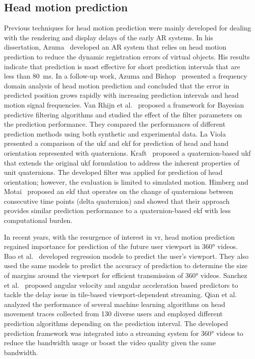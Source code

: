 \documentclass[sigconf]{acmart}			%
\begin{document}
\subsection{Head motion prediction}
\label{sec:prediction_bg}
Previous techniques for head motion prediction were mainly developed for dealing with the rendering and display delays of the early AR systems.
In his dissertation, Azuma~\cite{azuma1995} developed an AR system that relies on head motion prediction to reduce the dynamic registration errors of virtual objects. His results indicate that prediction is most effective for short prediction intervals that are less than \SI{80}{ms}.
In a follow-up work, Azuma and Bishop~\cite{azuma1995_freq} presented a frequency domain analysis of head motion prediction and concluded that the error in predicted position grows rapidly with increasing prediction intervals and head motion signal frequencies.
Van Rhijn et al.~\cite{van_rhijn2005} proposed a framework for Bayesian predictive filtering algorithms and studied the effect of the filter parameters on the prediction performance. 
They compared the performances of different prediction methods using both synthetic and experimental data.
La Viola~\cite{laviola2003} presented a comparison of the \gls{ukf} and \gls{ekf} for prediction of head and hand orientation represented with quaternions.
Kraft~\cite{kraft2003} proposed a quaternion-based \gls{ukf} that extends the original \gls{ukf} formulation to address the inherent properties of unit quaternions. The developed filter was applied for prediction of head orientation; however, the evaluation is limited to simulated motion.
Himberg and Motai~\cite{himberg2009} proposed an \gls{ekf} that operates on the change of quaternions between consecutive time points (delta quaternion) and showed that their approach provides similar prediction performance to a quaternion-based \gls{ekf} with less computational burden.

In recent years, with the resurgence of interest in \gls{vr}, head motion prediction regained importance for prediction of the future user viewport in \ang{360} videos.
Bao et al.~\cite{bao2016} developed regression models to predict the user's viewport. 
They also used the same models to predict the accuracy of prediction to determine the size of margins around the viewport for efficient transmission of \ang{360} videos.
Sanchez et al.~\cite{sanchez2019} proposed angular velocity and angular acceleration based predictors to tackle the delay issue in tile-based viewport-dependent streaming.
Qian et al.~\cite{qian2018_flare} analyzed the performance of several machine learning algorithms on head movement traces collected from 130 diverse users and employed different prediction algorithms depending on the prediction interval. 
The developed prediction framework was integrated into a streaming system for \ang{360} videos to reduce the bandwidth usage or boost the video quality given the same bandwidth.
\end{document}
